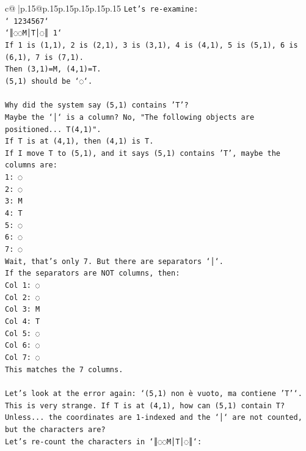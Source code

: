 \documentclass{article}
\begin{document}
{\begin{supertabular}{c@{$\;$}|p{.15\linewidth}@{}p{.15\linewidth}p{.15\linewidth}p{.15\linewidth}p{.15\linewidth}p{.15\linewidth}}
{{{\texttt{Let's re{-}examine:} \\
\texttt{` 1234567`} \\
\texttt{`║◌◌M│T│◌║ 1`} \\
\texttt{If 1 is (1,1), 2 is (2,1), 3 is (3,1), 4 is (4,1), 5 is (5,1), 6 is (6,1), 7 is (7,1).} \\
\texttt{Then (3,1)=M, (4,1)=T.} \\
\texttt{(5,1) should be `◌`.} \\
\\ 
\texttt{Why did the system say (5,1) contains 'T'?} \\
\texttt{Maybe the `│` is a column? No, "The following objects are positioned... T(4,1)".} \\
\texttt{If T is at (4,1), then (4,1) is T.} \\
\texttt{If I move T to (5,1), and it says (5,1) contains 'T', maybe the columns are:} \\
\texttt{1: ◌} \\
\texttt{2: ◌} \\
\texttt{3: M} \\
\texttt{4: T} \\
\texttt{5: ◌} \\
\texttt{6: ◌} \\
\texttt{7: ◌} \\
\texttt{Wait, that's only 7. But there are separators `│`.} \\
\texttt{If the separators are NOT columns, then:} \\
\texttt{Col 1: ◌} \\
\texttt{Col 2: ◌} \\
\texttt{Col 3: M} \\
\texttt{Col 4: T} \\
\texttt{Col 5: ◌} \\
\texttt{Col 6: ◌} \\
\texttt{Col 7: ◌} \\
\texttt{This matches the 7 columns.} \\
\\ 
\texttt{Let's look at the error again: `(5,1) non è vuoto, ma contiene 'T'`.} \\
\texttt{This is very strange. If T is at (4,1), how can (5,1) contain T?} \\
\texttt{Unless... the coordinates are 1{-}indexed and the `│` are not counted, but the characters are?} \\
\texttt{Let's re{-}count the characters in `║◌◌M│T│◌║`:} \\
}}}
\end{supertabular}}
\end{document}
